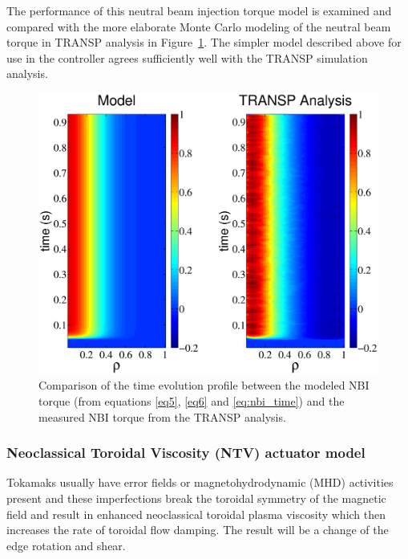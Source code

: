 \documentclass[12pt]{iopart}
\begin{document}
The performance of this neutral beam injection torque model is examined and compared with the more elaborate Monte Carlo modeling of the neutral beam torque in TRANSP analysis in Figure~\ref{fig:Fullnbi}. The simpler model described above for use in the controller agrees sufficiently well with the TRANSP simulation analysis.
\begin{figure}
\centering
\includegraphics[width= \linewidth]{imene_figs/Goum9}%
\caption{Comparison of the time evolution profile between the modeled NBI torque (from equations \ref{eq5}, \ref{eq6} and \ref{eq:nbi_time}) and the measured NBI torque from the TRANSP analysis.}
\label{fig:Fullnbi}
\end{figure}



\subsubsection{Neoclassical Toroidal Viscosity (NTV) actuator model}
 \label{TNTV}

Tokamaks usually have error fields or magnetohydrodynamic (MHD) activities present and these imperfections break the toroidal symmetry of the magnetic field and result in enhanced neoclassical toroidal plasma viscosity which then increases the rate of toroidal flow damping. The result will be a change of the edge rotation and shear. 
\end{document}
